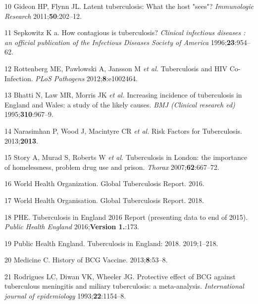 \documentclass[11pt,twoside]{bristolthesis}
\begin{document}
  \leavevmode\hypertarget{ref-Gideon2011a}{}%
  10 Gideon HP, Flynn JL. Latent tuberculosis: What the host "sees"? \emph{Immunologic Research} 2011;\textbf{50}:202--12.
  
  \leavevmode\hypertarget{ref-Sepkowitz1996}{}%
  11 Sepkowitz K a. How contagious is tuberculosis? \emph{Clinical infectious diseases : an official publication of the Infectious Diseases Society of America} 1996;\textbf{23}:954--62.
  
  \leavevmode\hypertarget{ref-Rottenberg2012}{}%
  12 Rottenberg ME, Pawlowski A, Jansson M \emph{et al.} Tuberculosis and HIV Co-Infection. \emph{PLoS Pathogens} 2012;\textbf{8}:e1002464.
  
  \leavevmode\hypertarget{ref-Bhatti1995}{}%
  13 Bhatti N, Law MR, Morris JK \emph{et al.} Increasing incidence of tuberculosis in England and Wales: a study of the likely causes. \emph{BMJ (Clinical research ed)} 1995;\textbf{310}:967--9.
  
  \leavevmode\hypertarget{ref-Narasimhan2013}{}%
  14 Narasimhan P, Wood J, Macintyre CR \emph{et al.} Risk Factors for Tuberculosis. 2013;\textbf{2013}.
  
  \leavevmode\hypertarget{ref-Story2007}{}%
  15 Story A, Murad S, Roberts W \emph{et al.} Tuberculosis in London: the importance of homelessness, problem drug use and prison. \emph{Thorax} 2007;\textbf{62}:667--72.
  
  \leavevmode\hypertarget{ref-WHOTB2016}{}%
  16 World Health Organization. Global Tuberculosis Report. 2016.
  
  \leavevmode\hypertarget{ref-WHO:2018}{}%
  17 World Health Organisation. Global Tuberculosis Report. 2018.
  
  \leavevmode\hypertarget{ref-PHE2016a}{}%
  18 PHE. Tuberculosis in England 2016 Report (presenting data to end of 2015). \emph{Public Health England} 2016;\textbf{Version 1.}:173.
  
  \leavevmode\hypertarget{ref-PHE2018}{}%
  19 Public Health England. Tuberculosis in England: 2018. 2019;1--218.
  
  \leavevmode\hypertarget{ref-Medicine2013}{}%
  20 Medicine C. History of BCG Vaccine. 2013;\textbf{8}:53--8.
  
  \leavevmode\hypertarget{ref-Rodrigues1993}{}%
  21 Rodrigues LC, Diwan VK, Wheeler JG. Protective effect of BCG against tuberculous meningitis and miliary tuberculosis: a meta-analysis. \emph{International journal of epidemiology} 1993;\textbf{22}:1154--8.
  
\end{document}
